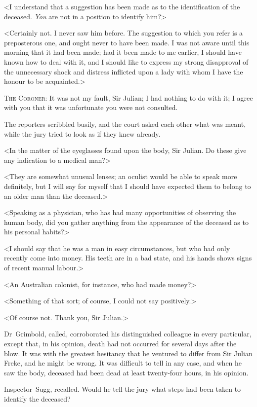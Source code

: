 <I understand that a suggestion has been made as to the identification of the deceased. \emph{You} are not in a position to identify him?>

<Certainly not. I never saw him before. The suggestion to which you refer is a preposterous one, and ought never to have been made. I was not aware until this morning that it had been made; had it been made to me earlier, I should have known how to deal with it, and I should like to express my strong disapproval of the unnecessary shock and distress inflicted upon a lady with whom I have the honour to be acquainted.>

\textsc{The Coroner}: It was not my fault, Sir Julian; I had nothing to do with it; I agree with you that it was unfortunate you were not consulted.

The reporters scribbled busily, and the court asked each other what was meant, while the jury tried to look as if they knew already.

<In the matter of the eyeglasses found upon the body, Sir Julian. Do these give any indication to a medical man?>

<They are somewhat unusual lenses; an oculist would be able to speak more definitely, but I will say for myself that I should have expected them to belong to an older man than the deceased.>

<Speaking as a physician, who has had many opportunities of observing the human body, did you gather anything from the appearance of the deceased as to his personal habits?>

<I should say that he was a man in easy circumstances, but who had only recently come into money. His teeth are in a bad state, and his hands shows signs of recent manual labour.>

<An Australian colonist, for instance, who had made money?>

<Something of that sort; of course, I could not say positively.>

<Of course not. Thank you, Sir Julian.>

Dr~Grimbold, called, corroborated his distinguished colleague in every particular, except that, in his opinion, death had not occurred for several days after the blow. It was with the greatest hesitancy that he ventured to differ from Sir Julian Freke, and he might be wrong. It was difficult to tell in any case, and when he saw the body, deceased had been dead at least twenty-four hours, in his opinion.

Inspector~Sugg, recalled. Would he tell the jury what steps had been taken to identify the deceased?


